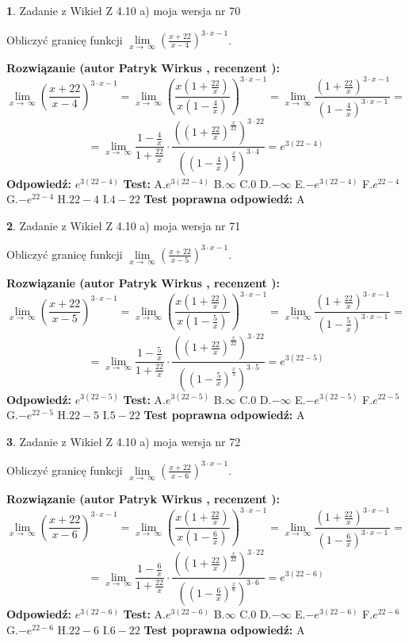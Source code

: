 \documentclass[12pt, a4paper]{article}
\theoremstyle{definition} %
\newtheorem{zad}{}
\newcommand{\zadStart}[1]{\begin{zad}#1\newline}
\newcommand{\zadStop}{\end{zad}}
\newcommand{\rozwStart}[2]{\noindent \textbf{Rozwiązanie (autor #1 , recenzent #2): }\newline}
\newcommand{\rozwStop}{\newline}
\newcommand{\odpStart}{\noindent \textbf{Odpowiedź:}\newline}
\newcommand{\odpStop}{\newline}
\newcommand{\testStart}{\noindent \textbf{Test:}\newline}
\newcommand{\testStop}{\newline}
\newcommand{\kluczStart}{\noindent \textbf{Test poprawna odpowiedź:}\newline}
\newcommand{\kluczStop}{\newline}
\begin{document}
\zadStart{Zadanie z Wikieł Z 4.10 a) moja wersja nr 70}


Obliczyć granicę funkcji  $\lim\limits_{x\to\ \infty}(\frac{x+22}{x-4})^{3\cdot x-1}$.
\zadStop
\rozwStart{Patryk Wirkus}{}
$$\lim\limits_{x\to\ \infty}(\frac{x+22}{x-4})^{3\cdot x-1} = \lim\limits_{x\to\ \infty}(\frac{x(1+\frac{22}{x})}{x(1-\frac{4}{x})})^{3\cdot x-1}=\lim\limits_{x\to\ \infty}\frac{(1+\frac{22}{x})^{3\cdot x-1}}{(1-\frac{4}{x})^{3\cdot x-1}}=$$
$$=\lim\limits_{x\to\ \infty}\frac{1-\frac{4}{x}}{1+\frac{22}{x}}\cdot\frac{((1+\frac{22}{x})^{\frac{x}{22}})^{3\cdot22}}{((1-\frac{4}{x})^{\frac{x}{4}})^{3\cdot4}}=e^{3(22-4)}$$
\rozwStop
\odpStart
$e^{3(22-4)}$
\odpStop
\testStart
A.$e^{3(22-4)}$ B.$\infty$ C.$0$ D.$-\infty$ E.$-e^{3(22-4)}$
F.$e^{22-4}$ G.$-e^{22-4}$
H.$22-4$
I.$4-22$
\testStop
\kluczStart
A
\kluczStop



\zadStart{Zadanie z Wikieł Z 4.10 a) moja wersja nr 71}


Obliczyć granicę funkcji  $\lim\limits_{x\to\ \infty}(\frac{x+22}{x-5})^{3\cdot x-1}$.
\zadStop
\rozwStart{Patryk Wirkus}{}
$$\lim\limits_{x\to\ \infty}(\frac{x+22}{x-5})^{3\cdot x-1} = \lim\limits_{x\to\ \infty}(\frac{x(1+\frac{22}{x})}{x(1-\frac{5}{x})})^{3\cdot x-1}=\lim\limits_{x\to\ \infty}\frac{(1+\frac{22}{x})^{3\cdot x-1}}{(1-\frac{5}{x})^{3\cdot x-1}}=$$
$$=\lim\limits_{x\to\ \infty}\frac{1-\frac{5}{x}}{1+\frac{22}{x}}\cdot\frac{((1+\frac{22}{x})^{\frac{x}{22}})^{3\cdot22}}{((1-\frac{5}{x})^{\frac{x}{5}})^{3\cdot5}}=e^{3(22-5)}$$
\rozwStop
\odpStart
$e^{3(22-5)}$
\odpStop
\testStart
A.$e^{3(22-5)}$ B.$\infty$ C.$0$ D.$-\infty$ E.$-e^{3(22-5)}$
F.$e^{22-5}$ G.$-e^{22-5}$
H.$22-5$
I.$5-22$
\testStop
\kluczStart
A
\kluczStop



\zadStart{Zadanie z Wikieł Z 4.10 a) moja wersja nr 72}


Obliczyć granicę funkcji  $\lim\limits_{x\to\ \infty}(\frac{x+22}{x-6})^{3\cdot x-1}$.
\zadStop
\rozwStart{Patryk Wirkus}{}
$$\lim\limits_{x\to\ \infty}(\frac{x+22}{x-6})^{3\cdot x-1} = \lim\limits_{x\to\ \infty}(\frac{x(1+\frac{22}{x})}{x(1-\frac{6}{x})})^{3\cdot x-1}=\lim\limits_{x\to\ \infty}\frac{(1+\frac{22}{x})^{3\cdot x-1}}{(1-\frac{6}{x})^{3\cdot x-1}}=$$
$$=\lim\limits_{x\to\ \infty}\frac{1-\frac{6}{x}}{1+\frac{22}{x}}\cdot\frac{((1+\frac{22}{x})^{\frac{x}{22}})^{3\cdot22}}{((1-\frac{6}{x})^{\frac{x}{6}})^{3\cdot6}}=e^{3(22-6)}$$
\rozwStop
\odpStart
$e^{3(22-6)}$
\odpStop
\testStart
A.$e^{3(22-6)}$ B.$\infty$ C.$0$ D.$-\infty$ E.$-e^{3(22-6)}$
F.$e^{22-6}$ G.$-e^{22-6}$
H.$22-6$
I.$6-22$
\testStop
\kluczStart
A
\kluczStop
\end{document}
